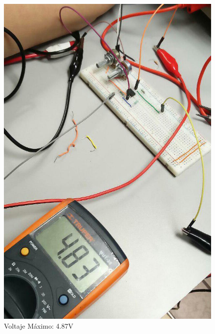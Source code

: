 \documentclass[12pt, fleqn]{article}                            %
\theoremstyle{break}                                            %
\begin{document}
\begin{figure}[!htb]
\begin{minipage}{0.5\textwidth}
                \includegraphics[width=0.85\linewidth]{Medicion2VoltajeMax}
                \caption{Voltaje Máximo: 4.87V}
                \end{minipage}
            \end{figure}
\end{document}
